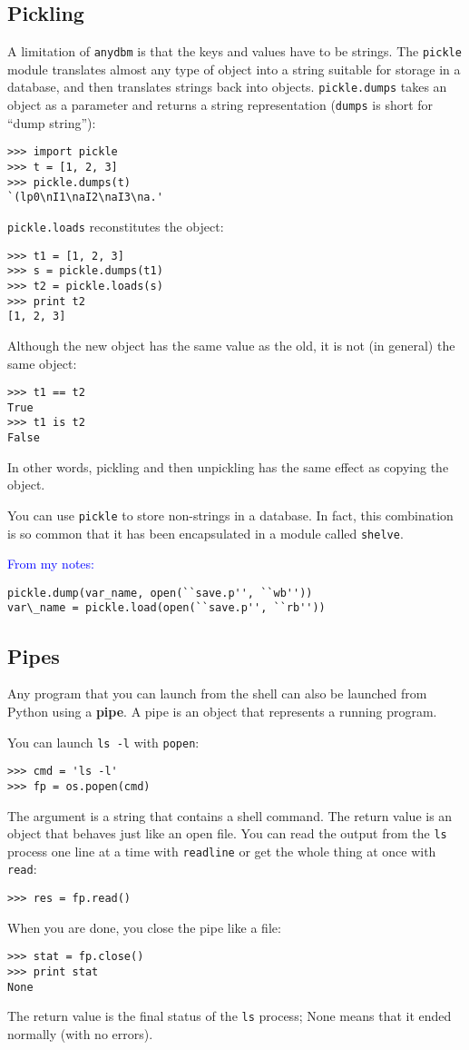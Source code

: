 \documentclass{article}
\begin{document}
\begin{multicols}{2}
\subsection{Pickling}
A limitation of \verb|anydbm| is that the keys and values have to be
strings. The \verb|pickle| module translates almost any type of object
into a string suitable for storage in a database, and then translates
strings back into objects. \verb|pickle.dumps| takes an object as a
parameter and returns a string representation (\verb|dumps| is short
for ``dump string''):
\begin{lstlisting}
>>> import pickle
>>> t = [1, 2, 3]
>>> pickle.dumps(t)
`(lp0\nI1\naI2\naI3\na.'
\end{lstlisting}
\verb|pickle.loads| reconstitutes the object:
\begin{lstlisting}
>>> t1 = [1, 2, 3]
>>> s = pickle.dumps(t1)
>>> t2 = pickle.loads(s)
>>> print t2
[1, 2, 3]
\end{lstlisting}
Although the new object has the same value as the old, it is not (in
general) the same object:
\begin{lstlisting}
>>> t1 == t2
True
>>> t1 is t2
False
\end{lstlisting}
In other words, pickling and then unpickling has the same effect as
copying the object.

You can use \verb|pickle| to store non-strings in a database. In fact,
this combination is so common that it has been encapsulated in a
module called \verb|shelve|.

\textcolor{blue}{From my notes:}
\begin{lstlisting}
pickle.dump(var_name, open(``save.p'', ``wb''))
var\_name = pickle.load(open(``save.p'', ``rb''))
\end{lstlisting}

\subsection{Pipes} %
Any program that you can launch from the shell can also be launched
from Python using a \textbf{pipe}. A pipe is an object that represents a
running program.

You can launch \verb|ls -l| with \verb|popen|:
\begin{lstlisting}
>>> cmd = 'ls -l'
>>> fp = os.popen(cmd)
\end{lstlisting}
The argument is a string that contains a shell command. The return
value is an object that behaves just like an open file. You can read
the output from the \verb|ls| process one line at a time with \verb|readline|
or get the whole thing at once with \verb|read|:
\begin{lstlisting}
>>> res = fp.read()
\end{lstlisting}
When you are done, you close the pipe like a file:
\begin{lstlisting}
>>> stat = fp.close()
>>> print stat
None
\end{lstlisting}
The return value is the final status of the \verb|ls| process;
None means that it ended normally (with no errors).


\end{multicols}
\end{document}

